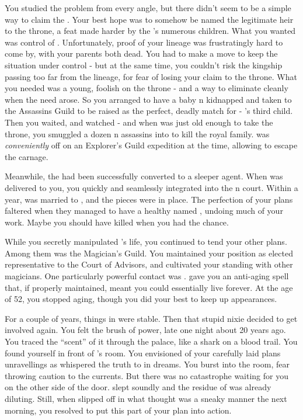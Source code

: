 \documentclass[char]{NeptuneBall}
\begin{document}
You studied the problem from every angle, but there didn't seem to be a simple way to claim the \iTrident{\MYname}. Your best hope was to somehow be named the legitimate heir to the throne, a feat made harder by the \cExKing{\King}'s numerous children. What you wanted was control of \pAtlantis{}.  Unfortunately, proof of your lineage was frustratingly hard to come by, with your parents both dead. You had to make a move to keep the situation under control - but at the same time, you couldn't risk the kingship passing too far from the \cExExKing{} lineage, for fear of losing your claim to the throne. What you needed was a young, foolish \cKing{\King} on the throne - and a way to eliminate \cKing{\them} cleanly when the need arose. So you arranged to have a baby \pAtlantis{}n \cQueen{\kid} kidnapped and taken to the Assassins Guild to be raised as the perfect, deadly match for \cKing{} - \cExKing{}'s third child. Then you waited, and watched - and when \cKing{} was just old enough to take the throne, you smuggled a dozen \pPacifica{}n assassins into \pAtlantis{} to kill the royal family. \cKing{} was \emph{conveniently} off on an Explorer's Guild expedition at the time, allowing \cKing{\them} to escape the carnage.

Meanwhile, the \cQueen{\kid} had been successfully converted to a sleeper agent. When \cQueen{} was delivered to you, you quickly and seamlessly integrated \cQueen{\them} into the \pAtlantis{}n court. Within a year, \cKing{} was married to \cQueen{}, and the pieces were in place. The perfection of your plans faltered when they managed to have a healthy \cAriel{\offspring} named \cAriel{}, undoing much of your work. Maybe you should have killed \cKing{} when you had the chance.

While you secretly manipulated \cKing{\King} \cKing{}'s life, you continued to tend your other plans. Among them was the Magician's Guild. You maintained your position as elected representative to the Court of Advisors, and cultivated your standing with other magicians. One particularly powerful contact was \cWitch{}. \cWitch{\They} gave you an anti-aging spell that, if properly maintained, meant you could essentially live forever. At the age of 52, you stopped aging, though you did your best to keep up appearances.

For a couple of years, things in \pAtlantis{} were stable. Then that stupid nixie decided to get involved again. You felt the brush of \cNixie{\their} power, late one night about 20 years ago. You traced the ``scent'' of it through the palace, like a shark on a blood trail. You found yourself in front of \cQueen{}'s room. You envisioned of your carefully laid plans unravellings as \cNixie{} whispered the truth to \cQueen{} in dreams. You burst into the room, fear throwing caution to the currents. But there was no catastrophe waiting for you on the other side of the door. \cQueen{} slept soundly and the residue of \cNixie{} was already diluting. Still, when \cQueen{} slipped off in what \cQueen{\they} thought was a sneaky manner the next morning, you resolved to put this part of your plan into action.
\end{document}
